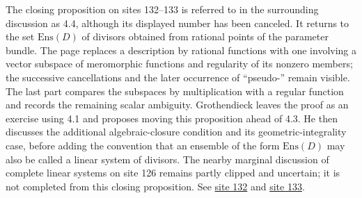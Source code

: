 \documentclass[10pt,a4paper]{article}
\begin{document}
The closing proposition on sites 132--133 is referred to in the surrounding discussion as 4.4, although its displayed number has been canceled. It returns to the set \(\mathrm{Ens}(D)\) of divisors obtained from rational points of the parameter bundle. The page replaces a description by rational functions with one involving a vector subspace of meromorphic functions and regularity of its nonzero members; the successive cancellations and the later occurrence of ``pseudo-'' remain visible. The last part compares the subspaces by multiplication with a regular function and records the remaining scalar ambiguity. Grothendieck leaves the proof as an exercise using 4.1 and proposes moving this proposition ahead of 4.3. He then discusses the additional algebraic-closure condition and its geometric-integrality case, before adding the convention that an ensemble of the form \(\mathrm{Ens}(D)\) may also be called a linear system of divisors. The nearby marginal discussion of complete linear systems on site 126 remains partly clipped and uncertain; it is not completed from this closing proposition. See \href{https://grothendieck.umontpellier.fr/web/viewer.html?file=../25.pdf#page=133}{site 132} and \href{https://grothendieck.umontpellier.fr/web/viewer.html?file=../25.pdf#page=134}{site 133}.
\par{}

\par{}
\end{document}
